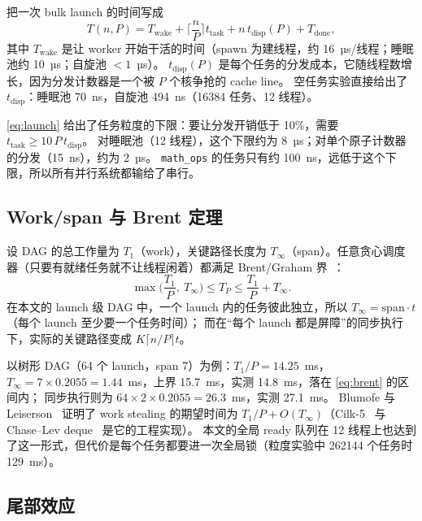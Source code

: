 \documentclass[11pt,a4paper]{ctexart}
\begin{document}
把一次 bulk launch 的时间写成
\begin{equation}
T(n, P) = T_{\text{wake}} + \Big\lceil \frac{n}{P} \Big\rceil t_{\text{task}} + n\, t_{\text{disp}}(P) + T_{\text{done}},
\label{eq:launch}
\end{equation}
其中 $T_{\text{wake}}$ 是让 worker 开始干活的时间（spawn 为建线程，约 16~µs/线程；睡眠池约 10~µs；自旋池 $<1$~µs）。
$t_{\text{disp}}(P)$ 是每个任务的分发成本，它随线程数增长，因为分发计数器是一个被 $P$ 个核争抢的 cache line。
空任务实验直接给出了 $t_{\text{disp}}$：睡眠池 70~ns，自旋池 494~ns（16384 任务、12 线程）。

\cref{eq:launch} 给出了任务粒度的下限：要让分发开销低于 10\%，需要 $t_{\text{task}} \ge 10\,P\,t_{\text{disp}}$。
对睡眠池（12 线程），这个下限约为 8~µs；对单个原子计数器的分发（15~ns），约为 2~µs。
\texttt{math\_\allowbreak{}ops} 的任务只有约 100~ns，远低于这个下限，所以所有并行系统都输给了串行。

\subsection{Work/span 与 Brent 定理}

设 DAG 的总工作量为 $T_1$（work），关键路径长度为 $T_\infty$（span）。任意贪心调度器（只要有就绪任务就不让线程闲着）都满足 Brent/Graham 界~\cite{brent,graham}：
\begin{equation}
\max\Big(\frac{T_1}{P},\ T_\infty\Big) \le T_P \le \frac{T_1}{P} + T_\infty .
\label{eq:brent}
\end{equation}
在本文的 launch 级 DAG 中，一个 launch 内的任务彼此独立，所以 $T_\infty = \text{span}\cdot t$（每个 launch 至少要一个任务时间）；
而在``每个 launch 都是屏障''的同步执行下，实际的关键路径变成 $K\lceil n/P\rceil t$。

以树形 DAG（64 个 launch，span 7）为例：$T_1/P = 14.25$~ms，$T_\infty = 7 \times 0.2055 = 1.44$~ms，上界 15.7~ms，实测 14.8~ms，落在 \cref{eq:brent} 的区间内；
同步执行则为 $64\times2\times0.2055 = 26.3$~ms，实测 27.1~ms。
Blumofe 与 Leiserson~\cite{blumofe} 证明了 work stealing 的期望时间为 $T_1/P + O(T_\infty)$（Cilk-5~\cite{cilk5} 与 Chase--Lev deque~\cite{chaselev} 是它的工程实现）。
本文的全局 ready 队列在 12 线程上也达到了这一形式，但代价是每个任务都要进一次全局锁（粒度实验中 262144 个任务时 129~ms）。

\subsection{尾部效应}
\end{document}
